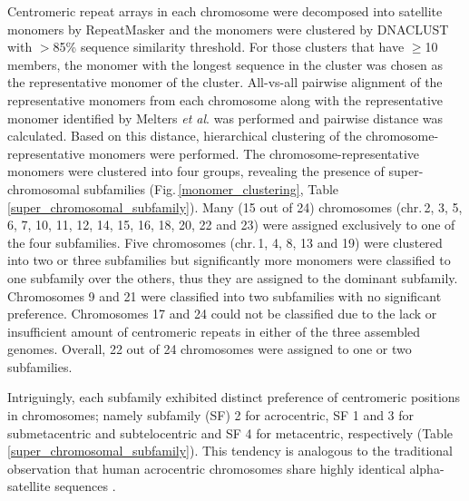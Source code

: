   Centromeric repeat arrays in each chromosome were decomposed into satellite monomers by RepeatMasker and the monomers were clustered by DNACLUST \cite{Ghodsi2011} with $>$85\% sequence similarity threshold. For those clusters that have $\geq$10 members, the monomer with the longest sequence in the cluster was chosen as the representative monomer of the cluster. All-vs-all pairwise alignment of the representative monomers from each chromosome along with the representative monomer identified by Melters \textit{et al}. was performed and pairwise distance was calculated. Based on this distance, hierarchical clustering of the chromosome-representative monomers were performed. The chromosome-representative monomers were clustered into four groups, revealing the presence of super-chromosomal subfamilies (Fig.\,\ref{monomer_clustering}, Table\,\ref{super_chromosomal_subfamily}). Many (15 out of 24) chromosomes (chr.\,2, 3, 5, 6, 7, 10, 11, 12, 14, 15, 16, 18, 20, 22 and 23) were assigned exclusively to one of the four subfamilies. Five chromosomes (chr.\,1, 4, 8, 13 and 19) were clustered into two or three subfamilies but significantly more monomers were classified to one subfamily over the others, thus they are assigned to the dominant subfamily. Chromosomes 9 and 21 were classified into two subfamilies with no significant preference. Chromosomes 17 and 24 could not be classified due to the lack or insufficient amount of centromeric repeats in either of the three assembled genomes. Overall, 22 out of 24 chromosomes were assigned to one or two subfamilies.

  Intriguingly, each subfamily exhibited distinct preference of centromeric positions in chromosomes; namely subfamily (SF) 2 for acrocentric, SF 1 and 3 for submetacentric and subtelocentric and SF 4 for metacentric, respectively (Table \ref{super_chromosomal_subfamily}). This tendency is analogous to the traditional observation that human acrocentric chromosomes share highly identical alpha-satellite sequences \cite{Willard1991}.

